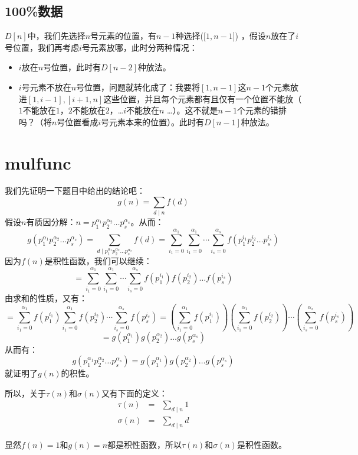 \documentclass{article}
\begin{document}
		\subsection{100\%数据}
			$D[n]$中，我们先选择$n$号元素的位置，有$n-1$种选择($[1,n-1$]) ，假设$n$放在了$i$号位置，我们再考虑$i$号元素放哪，此时分两种情况：
			\begin{itemize}
				\item $i$放在$n$号位置，此时有$D[n-2]$种放法。
				\item $i$号元素不放在$n$号位置，问题就转化成了：我要将$[1,n-1]$这$n-1$个元素放进$[1,i-1], [i+1,n]$这些位置，并且每个元素都有且仅有一个位置不能放（$1$不能放在$1$，$2$不能放在$2$，\dots $i$不能放在$n$ \dots ）。这不就是$n-1$个元素的错排吗？（将$n$号位置看成$i$号元素本来的位置）。此时有$D[n-1]$种放法。
			\end{itemize}
		\newpage
	\section{mulfunc}
		我们先证明一下题目中给出的结论吧：
		$$
			g(n) = \sum_{d \mid n}f(d)
		$$
		假设$n$有质因分解：$n = p_1^{\alpha_1}p_2^{\alpha_2}\dots p_s^{\alpha_s}$。从而：
		$$
			g(p_1^{\alpha_1}p_2^{\alpha_2}\dots p_s^{\alpha_s}) = \sum_{d \mid p_1^{\alpha_1}p_2^{\alpha_2}\dots p_s^{\alpha_s}}f(d) = \sum_{i_1 = 0}^{\alpha_1}\sum_{i_1 = 0}^{\alpha_1}\cdots\sum_{i_s = 0}^{\alpha_s}f(p_1^{i_1}p_2^{i_2}\dots p_s^{i_s}) 
		$$
		因为$f(n)$是积性函数，我们可以继续：
		$$
			= \sum_{i_1 = 0}^{\alpha_1}\sum_{i_1 = 0}^{\alpha_1}\cdots\sum_{i_s = 0}^{\alpha_s}f(p_1^{i_1})f(p_2^{i_2})\dots f(p_s^{i_s}) 
		$$
		由求和的性质，又有：
		$$
			= \sum_{i_1 = 0}^{\alpha_1}f(p_1^{i_1})\sum_{i_1 = 0}^{\alpha_1}f(p_2^{i_2})\cdots\sum_{i_s = 0}^{\alpha_s}f(p_s^{i_s}) =  (\sum_{i_1 = 0}^{\alpha_1}f(p_1^{i_1}))(\sum_{i_1 = 0}^{\alpha_1}f(p_2^{i_2}))\cdots(\sum_{i_s = 0}^{\alpha_s}f(p_s^{i_s}))
		$$
		$$
			= g( p_1^{\alpha_1})g(p_2^{\alpha_2})\dots　g(p_s^{\alpha_s})
		$$
		从而有：
		$$
		g(p_1^{\alpha_1}p_2^{\alpha_2}\dots p_s^{\alpha_s}) = g( p_1^{\alpha_1})g(p_2^{\alpha_2})\dots　g(p_s^{\alpha_s})
		$$
		就证明了$g(n)$的积性。
		
		所以，关于$\tau(n)$和$\sigma(n)$又有下面的定义：
		$$
			\begin{array}{rcl}
				\tau(n) &=& \sum_{d \mid n}1	\\
				\sigma(n) &=& \sum_{d \mid n}d
			\end{array} 
		$$

		显然$f(n)=1$和$g(n)=n$都是积性函数，所以$\tau(n)$和$\sigma(n)$是积性函数。
		
\end{document}
